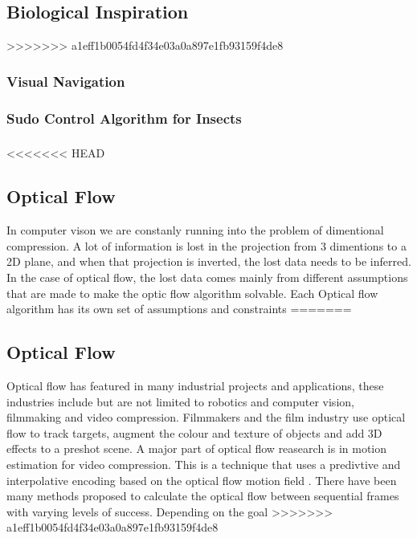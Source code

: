 \documentclass{UoNMCHA}
\numberwithin{equation}{section}
\begin{document}
\subsection{Biological Inspiration} %
>>>>>>> a1eff1b0054fd4f34e03a0a897e1fb93159f4de8
\subsubsection{Visual Navigation}
\subsubsection{Sudo Control Algorithm for Insects}
\subsubsection{}
<<<<<<< HEAD
\subsection{Optical Flow} %
In computer vison we are constanly running into the problem of dimentional compression. A lot of information is lost in the projection from 3 dimentions to a 2D plane, and when that projection is inverted, the lost data needs to be inferred. In the case of optical flow, the lost data comes mainly from different assumptions that are made to make the optic flow algorithm solvable. Each Optical flow algorithm has its own set of assumptions and constraints
=======
\subsubsection{}
\subsection{Optical Flow} %
Optical flow has featured in many industrial projects and applications, these industries include but are not limited to robotics and computer vision, filmmaking and video compression. Filmmakers and the film industry use optical flow to track targets, augment the colour and texture of objects and add 3D effects to a preshot scene. A major part of optical flow reasearch is in motion estimation for video compression. This is a technique that uses a predivtive and interpolative encoding based on the optical flow motion field \citep{le1991MPEG}. %
There have been many methods proposed to calculate the optical flow between sequential frames with varying levels of success. Depending on the goal 
>>>>>>> a1eff1b0054fd4f34e03a0a897e1fb93159f4de8
\end{document}
